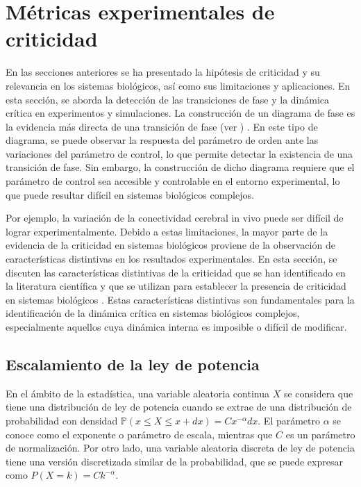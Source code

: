 \section{Métricas experimentales de criticidad}


En las secciones anteriores se ha presentado la hipótesis de criticidad y su relevancia en los sistemas biológicos, así como sus limitaciones y aplicaciones. En esta sección, se aborda la detección de las transiciones de fase y la dinámica crítica en experimentos y simulaciones.
La construcción de un diagrama de fase es la evidencia más directa de una transición de fase (ver  ) \cite{dickman_paths_2000}. En este tipo de diagrama, se puede observar la respuesta del parámetro de orden ante las variaciones del parámetro de control, lo que permite detectar la existencia de una transición de fase. Sin embargo, la construcción de dicho diagrama requiere que el parámetro de control sea accesible y controlable en el entorno experimental, lo que puede resultar difícil en sistemas biológicos complejos.

Por ejemplo, la variación de la conectividad cerebral in vivo puede ser difícil de lograr experimentalmente. Debido a estas limitaciones, la mayor parte de la evidencia de la criticidad en sistemas biológicos proviene de la observación de características distintivas en los resultados experimentales. En esta sección, se discuten las características distintivas de la criticidad que se han identificado en la literatura científica y que se utilizan para establecer la presencia de criticidad en sistemas biológicos \cite{hesse_self-organized_2014}. Estas características distintivas son fundamentales para la identificación de la dinámica crítica en sistemas biológicos complejos, especialmente aquellos cuya dinámica interna es imposible o difícil  de modificar.



\subsection{Escalamiento de la ley de potencia}


En el ámbito de la estadística, una variable aleatoria continua $X$ se considera que tiene una distribución de ley de potencia cuando se extrae de una distribución de probabilidad con densidad $	\mathbb{P}\left(x\leq X\leq x+dx\right)=Cx^{-\alpha}dx$. El parámetro $\alpha$ se conoce como el exponente o parámetro de escala, mientras que $C$ es un parámetro de normalización. Por otro lado, una variable aleatoria discreta de ley de potencia tiene una versión discretizada similar de la probabilidad, que se puede expresar como 	$P(X=k)=Ck^{-\alpha}$.

